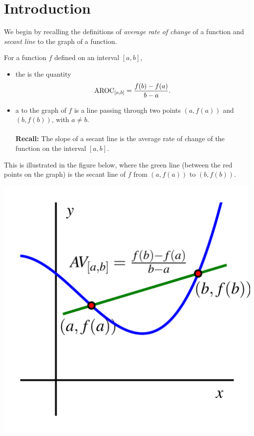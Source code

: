 \documentclass{ximera}
\begin{document}
\section{Introduction}
%
We begin by recalling the definitions of \textit{average rate of change} of a function and {\it secant line} to the graph of a function. 
\begin{definition}
For a function $f$ defined on an interval $[a,b]$, 
\begin{itemize}
\item the  is the quantity%
\begin{equation*}
\mathrm{AROC}_{[a,b]} = \frac{f(b) - f(a)}{b-a}\text{.}
\end{equation*}

\item a  to the graph of $f$ is a line passing through two points $(a,f(a))$ and $(b,f(b))$, with $a \neq b$. \\
\\
  {\bf Recall:} The slope of a secant line is the average rate of change of the function on the interval $[a,b]$.
\end{itemize}

This is illustrated in the figure below, where the green line (between the red points on the graph) is the secant line of $f$ from $(a,f(a))$ to $(b,f(b))$.

\begin{image}
\includegraphics{aroc-f-x-defn.png}
\end{image}

\end{definition}
\end{document}
